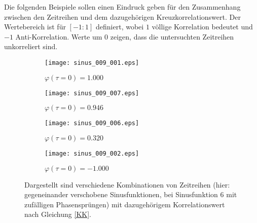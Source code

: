\documentclass[fontsize=11pt, twoside, a4paper]{scrartcl}
\begin{document}
Die folgenden Beispiele sollen einen Eindruck geben für den Zusammenhang zwischen den Zeitreihen und dem dazugehörigen Kreuzkorrelationswert. Der Wertebereich ist für $\left[-1:1\right]$ definiert, wobei $1$ völlige Korrelation bedeutet und $-1$ Anti-Korrelation. Werte um $0$ zeigen, dass die untersuchten Zeitreihen unkorreliert sind.
\begin{figure}[htbp]
\centering
	\begin{minipage}[t]{0.45\textwidth}
		\begin{figure}[H]
		\texttt{[image: sinus\_009\_001.eps]}
		\caption*{$\varphi(\tau=0) = 1.000$}
		\end{figure}
	\end{minipage}
	\begin{minipage}[t]{0.45\textwidth}
		\begin{figure}[H]
		\texttt{[image: sinus\_009\_007.eps]}
		\caption*{$\varphi(\tau=0) = 0.946$}
		\end{figure}
	\end{minipage}	


	\begin{minipage}[t]{0.45\textwidth}
		\begin{figure}[H]
		\texttt{[image: sinus\_009\_006.eps]}
		\caption*{$\varphi(\tau=0) = 0.320$}
		\end{figure}
	\end{minipage}	
	\begin{minipage}[t]{0.45\textwidth}
		\begin{figure}[H]
		\texttt{[image: sinus\_009\_002.eps]}
		\caption*{$\varphi(\tau=0) = -1.000$}
		\end{figure}
	\end{minipage}	
\caption{Dargestellt sind verschiedene Kombinationen von Zeitreihen (hier: gegeneinander verschobene Sinusfunktionen, bei Sinusfunktion 6 mit zufälligen Phasensprüngen) mit dazugehörigem Korrelationswert nach Gleichung \ref{KK}.}
\end{figure}
\end{document}
